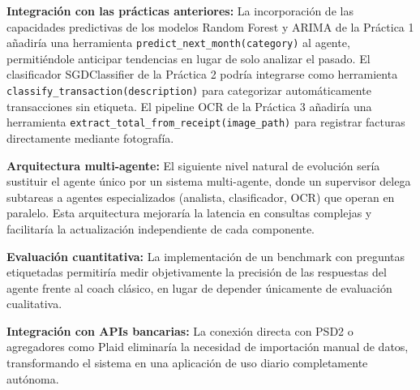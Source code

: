 \textbf{Integración con las prácticas anteriores:} La incorporación de las capacidades predictivas de los modelos Random Forest y ARIMA de la Práctica 1 añadiría una herramienta \texttt{predict\_next\_month(category)} al agente, permitiéndole anticipar tendencias en lugar de solo analizar el pasado. El clasificador SGDClassifier de la Práctica 2 podría integrarse como herramienta \texttt{classify\_transaction(description)} para categorizar automáticamente transacciones sin etiqueta. El pipeline OCR de la Práctica 3 añadiría una herramienta \texttt{extract\_total\_from\_receipt(image\_path)} para registrar facturas directamente mediante fotografía.

\textbf{Arquitectura multi-agente:} El siguiente nivel natural de evolución sería sustituir el agente único por un sistema multi-agente, donde un supervisor delega subtareas a agentes especializados (analista, clasificador, OCR) que operan en paralelo. Esta arquitectura mejoraría la latencia en consultas complejas y facilitaría la actualización independiente de cada componente.

\textbf{Evaluación cuantitativa:} La implementación de un benchmark con preguntas etiquetadas permitiría medir objetivamente la precisión de las respuestas del agente frente al coach clásico, en lugar de depender únicamente de evaluación cualitativa.

\textbf{Integración con APIs bancarias:} La conexión directa con PSD2 o agregadores como Plaid eliminaría la necesidad de importación manual de datos, transformando el sistema en una aplicación de uso diario completamente autónoma.